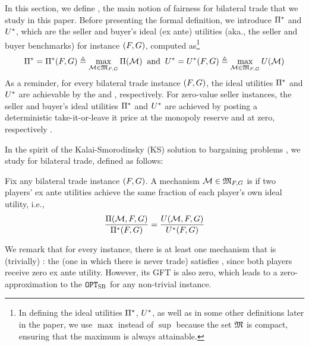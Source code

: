 In this section, we define {\ksfairness}, the main notion of fairness for bilateral trade that we study in this paper. Before presenting the formal definition, we introduce $\Pi^*$ and $U^*$, which are the seller and buyer's ideal (ex ante)  utilities (aka., the seller and buyer benchmarks) for instance $(F,G)$, computed as\footnote{In defining the ideal utilities $\Pi^*$, $U^*$, as well as in some other definitions later in the paper, we use $\max$ instead of $\sup$ because the set $\mathfrak{M}$ is compact, ensuring that the maximum is always attainable.}
\begin{align*}
{\Pi^*= 
    \Pi^*(F,G)} \triangleq \max\limits_{{\mathcal{M}\in\mathfrak{M}_{F,G}}}\Pi(\mathcal{M}) 
    \;\;
    \mbox{and}
    \;\; 
    {U^* = U^*(F,G)} \triangleq \max\limits_{\mathcal{M}\in\mathfrak{M}_{F,G}}U(\mathcal{M})
\end{align*}
As a {reminder}, for {every} bilateral trade instance $(F,G)$, the ideal utilities $\Pi^*$ and $U^*$ are achievable by the {\SellerOffer} and {\BuyerOffer} \citep{mye-81}, respectively. For zero-value seller instances, the seller and buyer's ideal utilities $\Pi^*$ and $U^*$ are achieved by posting a deterministic take-it-or-leave it price at the monopoly reserve and at zero, respectively \citep{mye-81}.

In the spirit of the Kalai-Smorodinsky (KS) solution to bargaining problems \citep{KS-75}, we study \emph{{\ksfairness}} for bilateral trade, defined as follows: 
\begin{definition}[{\ksfairness}]
\label{def:ks fairness} {Fix any bilateral trade instance $(F,G)$.} 
    A mechanism $\mathcal{M}\in\mathfrak{M}_{F,G}$ is \emph{{\ksfair}} if two players' ex ante utilities achieve the same fraction of
    each player's own ideal utility, i.e.,
    \begin{align*}
        \frac{\Pi(\mathcal{M},F,G)}{\Pi^*(F,G)}
        = \frac{U(\mathcal{M}, F,G)}{U^*(F,G)}
    \end{align*}
\end{definition}

We remark that for every instance, there is at least one mechanism that is (trivially) {\ksfair}: the {\NoTrade} (one in which there is never trade) satisfies {\ksfairness}, since both players receive zero ex ante utility. However, its GFT is also zero, which leads to a zero-approximation to the {\SecondBest} $\texttt{OPT}_{\textsc{SB}}$ for any non-trivial instance.

